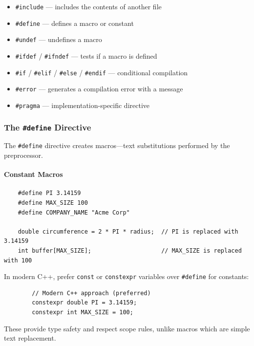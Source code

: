 \begin{itemize}
	\item \texttt{\#include} — includes the contents of another file
	\item \texttt{\#define} — defines a macro or constant
	\item \texttt{\#undef} — undefines a macro
	\item \texttt{\#ifdef} / \texttt{\#ifndef} — tests if a macro is defined
	\item \texttt{\#if} / \texttt{\#elif} / \texttt{\#else} / \texttt{\#endif} — conditional compilation
	\item \texttt{\#error} — generates a compilation error with a message
	\item \texttt{\#pragma} — implementation-specific directive
\end{itemize}

\subsubsection{The \texttt{\#define} Directive}

The \texttt{\#define} directive creates macros—text substitutions performed by the preprocessor.

\paragraph{Constant Macros}

\begin{lstlisting}
	#define PI 3.14159
	#define MAX_SIZE 100
	#define COMPANY_NAME "Acme Corp"
	
	double circumference = 2 * PI * radius;  // PI is replaced with 3.14159
	int buffer[MAX_SIZE];                    // MAX_SIZE is replaced with 100
\end{lstlisting}

\begin{remark}
	In modern C++, prefer \texttt{const} or \texttt{constexpr} variables over \texttt{\#define} for constants:
	
	\begin{lstlisting}
		// Modern C++ approach (preferred)
		constexpr double PI = 3.14159;
		constexpr int MAX_SIZE = 100;
	\end{lstlisting}
	
	These provide type safety and respect scope rules, unlike macros which are simple text replacement.
\end{remark}

